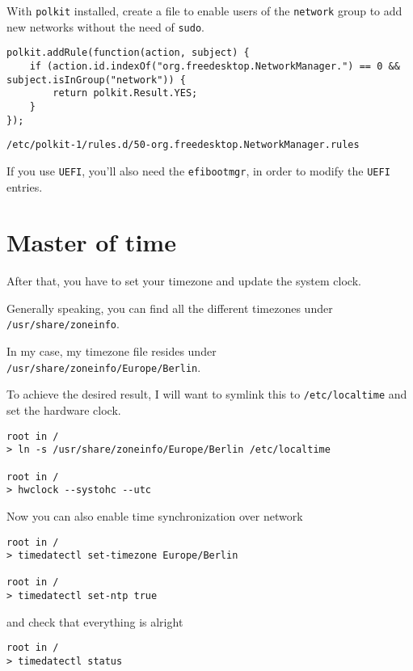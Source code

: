 \documentclass[10pt]{dustdoc}
\begin{document}
With \texttt{polkit} installed, create a file to enable users of the \texttt{network} group to add new networks without the need of \texttt{sudo}.

\begin{mintedlisting}
    \begin{verbatim}
polkit.addRule(function(action, subject) {
    if (action.id.indexOf("org.freedesktop.NetworkManager.") == 0 && subject.isInGroup("network")) {
        return polkit.Result.YES;
    }
});
    \end{verbatim}

    \caption{\texttt{/etc/polkit-1/rules.d/50-org.freedesktop.NetworkManager.rules}}
\end{mintedlisting}

If you use \texttt{UEFI}, you’ll also need the \texttt{efibootmgr}, in order to modify the \texttt{UEFI} entries.

\section{Master of time}%
\label{sec:master-of-time}

After that, you have to set your timezone and update the system clock.

Generally speaking, you can find all the different timezones under \texttt{/usr/share/zoneinfo}.

In my case, my timezone file resides under \texttt{/usr/share/zoneinfo/Europe/Berlin}.

To achieve the desired result, I will want to symlink this to \texttt{/etc/localtime} and set the hardware clock.

\begin{verbatim}
root in /
> ln -s /usr/share/zoneinfo/Europe/Berlin /etc/localtime

root in /
> hwclock --systohc --utc
\end{verbatim}

Now you can also enable time synchronization over network

\begin{verbatim}
root in /
> timedatectl set-timezone Europe/Berlin

root in /
> timedatectl set-ntp true
\end{verbatim}

\noindent
and check that everything is alright

\begin{verbatim}
root in /
> timedatectl status
\end{verbatim}
\end{document}

